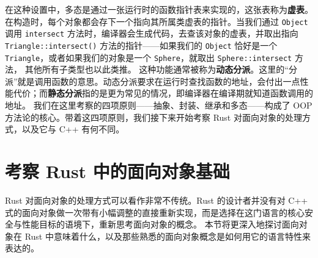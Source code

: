 \label{idx:idx_ff6b2e3e}
在这种设置中，多态是通过一张运行时的函数指针表来实现的，这张表称为\textbf{虚表}。在构造时，每个对象都会存下一个指向其所属类虚表的指针。当我们通过 \texttt{Object} 调用 \texttt{intersect} 方法时，编译器会生成代码，去查该对象的虚表，并取出指向 \texttt{Triangle::\allowbreak{}intersect(\allowbreak{})\allowbreak{}} 方法的指针——如果我们的
\texttt{Object} 恰好是一个 \texttt{Triangle}，或者如果我们的对象是一个 \texttt{Sphere}，就取出 \texttt{Sphere::\allowbreak{}intersect} 方法，
其他所有子类型也以此类推。
\label{idx:idx_82e0f2ca}
\label{idx:idx_a130bafa}
这种功能通常被称为\textbf{动态分派}。这里的“分派”就是调用函数的意思。动态分派要求在运行时查找函数的地址，会付出一点性能代价；而\textbf{静态分派}指的是更为常见的情况，即编译器在编译期就知道函数调用的地址。
我们在这里考察的四项原则——抽象、封装、继承和多态——构成了 OOP 方法论的核心。带着这四项原则，我们接下来开始考察 Rust 对面向对象的处理方式，以及它与 C++ 有何不同。
\section{考察 Rust 中的面向对象基础}
\label{idx:idx_fbe88e4d}
\label{idx:idx_7f427ab0}
Rust 对面向对象的处理方式可以看作非常不传统。Rust 的设计者并没有对 C++ 式的面向对象做一次带有小幅调整的直接重新实现，而是选择在这门语言的核心安全与性能目标的语境下，重新思考面向对象的概念。
本节将更深入地探讨面向对象在 Rust 中意味着什么，以及那些熟悉的面向对象概念是如何用它的语言特性来表达的。
